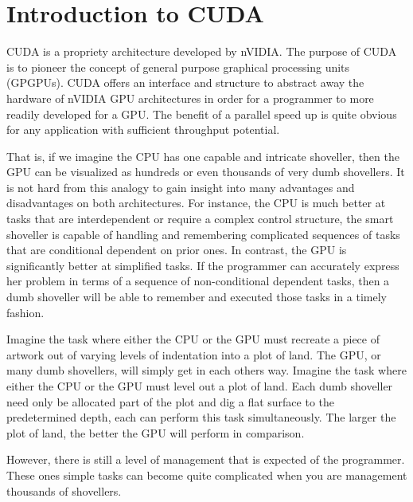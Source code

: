 \chapter{Introduction to CUDA} \label{ap:a}


CUDA is a propriety architecture developed by nVIDIA. The purpose of CUDA is to pioneer the concept of general purpose graphical processing units (GPGPUs). CUDA offers an interface and structure to abstract away the hardware of nVIDIA GPU architectures in order for a programmer to more readily developed for a GPU. The benefit of a parallel speed up is quite obvious for any application with sufficient throughput potential.

That is, if we imagine the CPU has one capable and intricate shoveller, then the GPU can be visualized as hundreds or even thousands of very dumb shovellers. It is not hard from this analogy to gain insight into many advantages and disadvantages on both architectures. For instance, the CPU is much better at tasks that are interdependent or require a complex control structure, the smart shoveller is capable of handling and remembering complicated sequences of tasks that are conditional dependent on prior ones. In contrast, the GPU is significantly better at simplified tasks. If the programmer can accurately express her problem in terms of a sequence of non-conditional dependent tasks, then a dumb shoveller will be able to remember and executed those tasks in a timely fashion.

Imagine the task where either the CPU or the GPU must recreate a piece of artwork out of varying levels of indentation into a plot of land. The GPU, or many dumb shovellers, will simply get in each others way. Imagine the task where either the CPU or the GPU must level out a plot of land. Each dumb shoveller need only be allocated part of the plot and dig a flat surface to the predetermined depth, each can perform this task simultaneously. The larger the plot of land, the better the GPU will perform in comparison.

However, there is still a level of management that is expected of the programmer. These ones simple tasks can become quite complicated when you are management thousands of shovellers.


